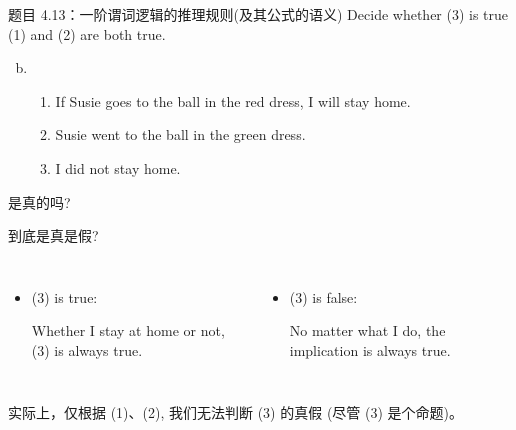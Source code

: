 \begin{frame}{}
  \begin{exampleblock}{题目 4.13：一阶谓词逻辑的推理规则(及其公式的语义)}
    Decide whether (3) is true  (1) and (2) are both true.

    \begin{enumerate}[(a)]
      \setcounter{enumi}{1}
      \item 
	\begin{enumerate}[(1)]
	  \item If Susie goes to the ball in the red dress, I will stay home.
	  \item Susie went to the ball in the green dress.
	  \item I did not stay home.
	\end{enumerate}
    \end{enumerate}
  \end{exampleblock}

  \centerline{是真的吗?}

  \pause
  \vspace{0.30cm}
  到底是真是假?
  \vspace{0.30cm}
  \begin{columns}
      \begin{itemize}
	\item (3) is true:

	Whether I stay at home or not, (3) is always true.
      \end{itemize}
      \begin{itemize}
        \item (3) is false:

	No matter what I do, the implication is always true.
      \end{itemize}
  \end{columns}

  \pause
  \vspace{0.50cm}
  实际上，仅根据 (1)、(2), 我们无法判断 (3) 的真假 (尽管 (3) 是个命题)。
\end{frame}

